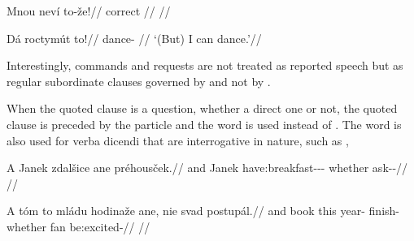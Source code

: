 
\pex
\begingl
\gla Mnou neví to-že!//
\glb correct  //
\glft {}//
\endgl
\xe

\pex
\begingl
\gla Dá roctymút to!//
\glb \First{}\Sg{} dance- //
\glft `(But) I can dance.'//
\endgl
\xe


Interestingly, commands and requests are not treated as reported speech but as regular subordinate clauses governed by  and not by .

When the quoted clause is a question, whether a direct one or not, the quoted clause is preceded by the particle  and the word  is used instead of . The word  is also used for verba dicendi that are interrogative in nature, such as ,

\pex
\begingl
  \gla A Janek zdalšice ane préhousček.//
  \glb and Janek have:breakfast-\Av{}-\Pf{}-\Quot{} whether ask-\Av{}-\Pf{}//
  \glft {}//
\endgl
\xe

\pex
\begingl
  \gla A tóm to mládu hodinaže ane, nie svad postupál.//
  \glb and book this year-\Ins{} finish- whether \Pl{} fan be:excited-//
  \glft {}//
\endgl
\xe
